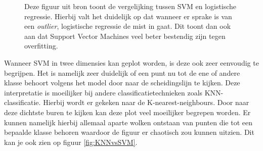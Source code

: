 \documentclass[TeamE-eindrapport]{subfiles}
\begin{document}
	\begin{figure}[h!]
		\centering
		\caption{Deze figuur uit bron \cite{Ramo_2017} toont de vergelijking tussen SVM en logistische regressie. Hierbij valt het duidelijk op dat wanneer er sprake is van een \textit{outlier}, logistische regressie de mist in gaat. Dit toont dan ook aan dat Support Vector Machines veel beter bestendig zijn tegen overfitting. }
		\label{fig:LogistischeRegressieVsSVM}
	\end{figure}
	
	Wanneer SVM in twee dimensies kan geplot worden, is deze ook zeer eenvoudig te begrijpen. Het is namelijk zeer duidelijk of een punt nu tot de ene of andere klasse behoort volgens het model door naar de scheidingslijn te kijken. Deze interpretatie is moeilijker bij andere classificatietechnieken zoals KNN-classificatie. Hierbij wordt er gekeken naar de K-nearest-neighbours. Door naar deze dichtste buren te kijken kan deze plot veel moeilijker begrepen worden. Er kunnen namelijk hierbij allemaal aparte wolken ontstaan van punten die tot een bepaalde klasse behoren waardoor de figuur er chaotisch zou kunnen uitzien. Dit kan je ook zien op figuur \ref{fig:KNNvsSVM}. 
	
\end{document}
